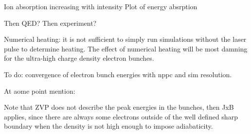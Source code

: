 Ion absorption increasing with intensity
Plot of energy absrption








Then QED?
Then experiment?

Numerical heating: it is not sufficient to simply run simulations without the laser pulse to determine heating. The effect of numerical heating will be most damning for the ultra-high charge density electron bunches.

To do: convergence of electron bunch energies with nppc and sim resolution.


At aome point mention:

Note that ZVP does not describe the peak energies in the bunches, then JxB applies, since there are always some electrons outside of the well defined sharp boundary when the density is not high enough to impose adiabaticity. 
